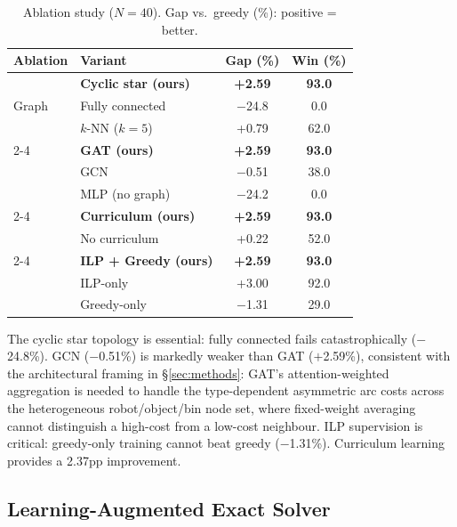 \documentclass[review,times]{elsarticle}
\begin{document}
\begin{table}[htbp]
\caption{Ablation study ($N{=}40$). Gap vs.\ greedy (\%): positive = better.}
\label{tab:ablations}
\centering
\begin{tabular}{@{}llcc@{}}
\toprule
\textbf{Ablation} & \textbf{Variant} & \textbf{Gap (\%)} & \textbf{Win (\%)} \\
\midrule
\multirow{3}{*}{Graph}
    & \textbf{Cyclic star (ours)} & \textbf{+2.59} & \textbf{93.0} \\
    & Fully connected & $-$24.8 & 0.0 \\
    & $k$-NN ($k{=}5$) & +0.79 & 62.0 \\
\cmidrule(l){2-4}
\multirow{3}{*}{Encoder}
    & \textbf{GAT (ours)} & \textbf{+2.59} & \textbf{93.0} \\
    & GCN & $-$0.51 & 38.0 \\
    & MLP (no graph) & $-$24.2 & 0.0 \\
\cmidrule(l){2-4}
\multirow{2}{*}{Curriculum}
    & \textbf{Curriculum (ours)} & \textbf{+2.59} & \textbf{93.0} \\
    & No curriculum & +0.22 & 52.0 \\
\cmidrule(l){2-4}
\multirow{3}{*}{Supervision}
    & \textbf{ILP + Greedy (ours)} & \textbf{+2.59} & \textbf{93.0} \\
    & ILP-only & +3.00 & 92.0 \\
    & Greedy-only & $-$1.31 & 29.0 \\
\bottomrule
\end{tabular}
\end{table}

The cyclic star topology is essential: fully connected fails catastrophically ($-$24.8\%). GCN ($-$0.51\%) is markedly weaker than GAT ($+$2.59\%), consistent with the architectural framing in \S\ref{sec:methods}: GAT's attention-weighted aggregation is needed to handle the type-dependent asymmetric arc costs across the heterogeneous robot/object/bin node set, where fixed-weight averaging cannot distinguish a high-cost from a low-cost neighbour. ILP supervision is critical: greedy-only training cannot beat greedy ($-$1.31\%). Curriculum learning provides a 2.37pp improvement.

\subsection{Learning-Augmented Exact Solver}\label{sec:hybrid_eval}
\end{document}
